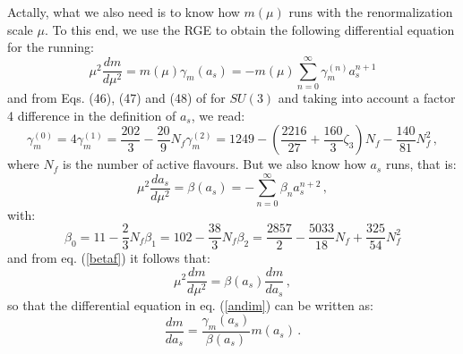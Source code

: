 \documentclass[10pt,a4paper]{article}
\begin{document}
Actally, what we also need is to know how $m(\mu)$ runs with the renormalization scale $\mu$. To this end, we use the RGE to obtain the following differential equation for the running:
\begin{equation}\label{andim}
\mu^2\frac{dm}{d\mu^2} = m(\mu)\gamma_m(a_s) = -m(\mu)\sum_{n=0}^{\infty}\gamma_m^{(n)}a_s^{n+1}
\end{equation}
and from Eqs. (46), (47) and (48) of \cite{Chetyrkin:1999pq} for $SU(3)$ and taking into account a factor 4 difference in the definition of $a_s$, we read:
\begin{subequations} 
\begin{equation}
\gamma_m^{(0)} = 4 
\end{equation}
\begin{equation}
\gamma_m^{(1)} = \frac{202}3 - \frac{20}{9}N_f
\end{equation}
\begin{equation}
\gamma_m^{(2)} = 1249 - \left(\frac{2216}{27}+\frac{160}{3}\zeta_3\right)N_f-\frac{140}{81}N_f^2\,,
\end{equation}
\end{subequations} 
where $N_f$ is the number of active flavours. But we also know how $a_s$ runs, that is:
\begin{equation}\label{betaf}
\mu^2\frac{da_s}{d\mu^2} = \beta(a_s) = -\sum_{n=0}^{\infty}\beta_n a_s^{n+2}\,,
\end{equation}
with:
\begin{subequations} 
\begin{equation}
\beta_0 = 11-\frac23 N_f 
\end{equation}
\begin{equation}
\beta_1 = 102 - \frac{38}3 N_f
\end{equation}
\begin{equation}
\beta_2 = \frac{2857}{2} - \frac{5033}{18}N_f + \frac{325}{54}N_f^2
\end{equation}
\end{subequations} 
and from eq. (\ref{betaf}) it follows that:
\begin{equation}
\mu^2\frac{dm}{d\mu^2} = \beta(a_s)\frac{d m}{da_s}\,,
\end{equation}
so that the differential equation in eq. (\ref{andim}) can be written as:
\begin{equation}\label{runmass}
\frac{dm}{da_s} = \frac{\gamma_m(a_s)}{\beta(a_s)}m(a_s)\,.
\end{equation}
\end{document}
